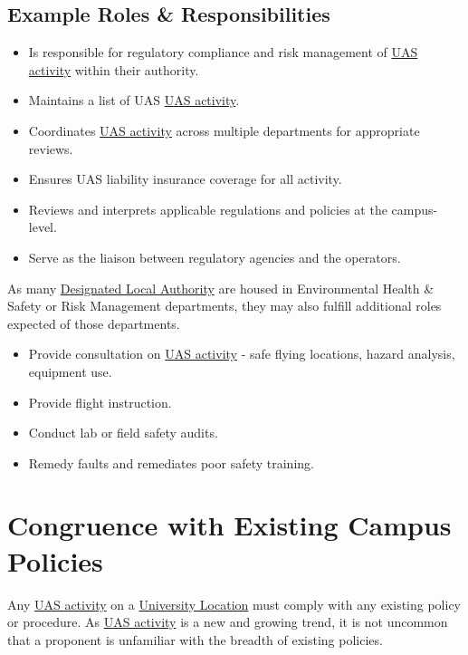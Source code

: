 \documentclass[
]{book}
\providecommand{\tightlist}{%
  \setlength{\itemsep}{0pt}\setlength{\parskip}{0pt}}
\begin{document}
\hypertarget{example-roles-responsibilities}{%
\subsection{Example Roles \& Responsibilities}\label{example-roles-responsibilities}}

\begin{itemize}
\tightlist
\item
  Is responsible for regulatory compliance and risk management of \protect\hyperlink{UASactivity}{UAS activity} within their authority.
\item
  Maintains a list of UAS \protect\hyperlink{UASactivity}{UAS activity}.
\item
  Coordinates \protect\hyperlink{UASactivity}{UAS activity} across multiple departments for appropriate reviews.
\item
  Ensures UAS liability insurance coverage for all activity.
\item
  Reviews and interprets applicable regulations and policies at the campus-level.
\item
  Serve as the liaison between regulatory agencies and the operators.
\end{itemize}

As many \protect\hyperlink{DLA}{Designated Local Authority} are housed in Environmental Health \& Safety or Risk Management departments, they may also fulfill additional roles expected of those departments.

\begin{itemize}
\tightlist
\item
  Provide consultation on \protect\hyperlink{UASactivity}{UAS activity} - safe flying locations, hazard analysis, equipment use.\\
\item
  Provide flight instruction.
\item
  Conduct lab or field safety audits.
\item
  Remedy faults and remediates poor safety training.
\end{itemize}

\hypertarget{congruence-with-existing-campus-policies}{%
\section{Congruence with Existing Campus Policies}\label{congruence-with-existing-campus-policies}}

Any \protect\hyperlink{UASactivity}{UAS activity} on a \protect\hyperlink{UL}{University Location} must comply with any existing policy or procedure. As \protect\hyperlink{UASactivity}{UAS activity} is a new and growing trend, it is not uncommon that a proponent is unfamiliar with the breadth of existing policies.
\end{document}
